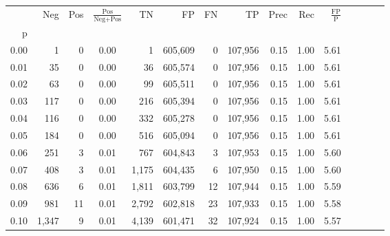 \begin{tabular}{rrrcrrrrrrrrrrr}
\toprule
{} &     Neg &    Pos & $\frac{\text{Pos}}{\text{Neg}+\text{Pos}}$ &       TN &       FP &       FN &       TP &  Prec &   Rec & $\frac{\text{FP}}{\text{P}}$ \\
p    &         &        &                                            &          &          &          &          &       &       &                              \\
\midrule
0.00 &       1 &      0 &                                       0.00 &        1 &  605,609 &        0 &  107,956 &  0.15 &  1.00 &                         5.61 \\
0.01 &      35 &      0 &                                       0.00 &       36 &  605,574 &        0 &  107,956 &  0.15 &  1.00 &                         5.61 \\
0.02 &      63 &      0 &                                       0.00 &       99 &  605,511 &        0 &  107,956 &  0.15 &  1.00 &                         5.61 \\
0.03 &     117 &      0 &                                       0.00 &      216 &  605,394 &        0 &  107,956 &  0.15 &  1.00 &                         5.61 \\
0.04 &     116 &      0 &                                       0.00 &      332 &  605,278 &        0 &  107,956 &  0.15 &  1.00 &                         5.61 \\
0.05 &     184 &      0 &                                       0.00 &      516 &  605,094 &        0 &  107,956 &  0.15 &  1.00 &                         5.61 \\
0.06 &     251 &      3 &                                       0.01 &      767 &  604,843 &        3 &  107,953 &  0.15 &  1.00 &                         5.60 \\
0.07 &     408 &      3 &                                       0.01 &    1,175 &  604,435 &        6 &  107,950 &  0.15 &  1.00 &                         5.60 \\
0.08 &     636 &      6 &                                       0.01 &    1,811 &  603,799 &       12 &  107,944 &  0.15 &  1.00 &                         5.59 \\
0.09 &     981 &     11 &                                       0.01 &    2,792 &  602,818 &       23 &  107,933 &  0.15 &  1.00 &                         5.58 \\
0.10 &   1,347 &      9 &                                       0.01 &    4,139 &  601,471 &       32 &  107,924 &  0.15 &  1.00 &                         5.57 \\

\end{tabular}
